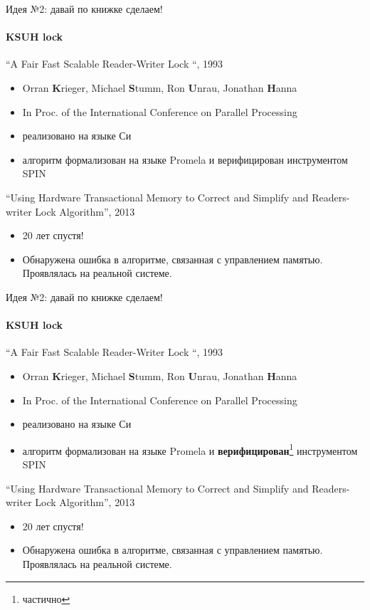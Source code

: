 \begin{frame}[t]{Идея №2: давай по книжке сделаем!}
\framesubtitle{KSUH lock}

“A Fair Fast Scalable Reader-Writer Lock “, 1993

\begin{itemize}
  \item Orran \textbf{K}rieger, Michael \textbf{S}tumm, Ron \textbf{U}nrau, Jonathan \textbf{H}anna
  \item In Proc. of the International Conference on Parallel Processing

  \pause
  \item реализовано на языке Си

  \pause
  \item алгоритм формализован на языке Promela и верифицирован инструментом SPIN %

\end{itemize}

\pause

“Using Hardware Transactional Memory to Correct and Simplify and Readers-writer Lock Algorithm”, 2013
\begin{itemize}

  \pause
  \item 20 лет спустя!

  \pause
  \item Обнаружена ошибка в алгоритме, связанная с управлением памятью. Проявлялась на реальной системе.
\end{itemize}

\end{frame}


\begin{frame}[t,noframenumbering]{Идея №2: давай по книжке сделаем!}
\framesubtitle{KSUH lock}

“A Fair Fast Scalable Reader-Writer Lock “, 1993

\begin{itemize}
  \item Orran \textbf{K}rieger, Michael \textbf{S}tumm, Ron \textbf{U}nrau, Jonathan \textbf{H}anna
  \item In Proc. of the International Conference on Parallel Processing
  \item реализовано на языке Си
  \item алгоритм формализован на языке Promela и \textbf{верифицирован}\footnote{частично} инструментом SPIN
\end{itemize}

“Using Hardware Transactional Memory to Correct and Simplify and Readers-writer Lock Algorithm”, 2013
\begin{itemize}
  \item 20 лет спустя!
  \item Обнаружена ошибка в алгоритме, связанная с управлением памятью. Проявлялась на реальной системе.
\end{itemize}

\end{frame}


